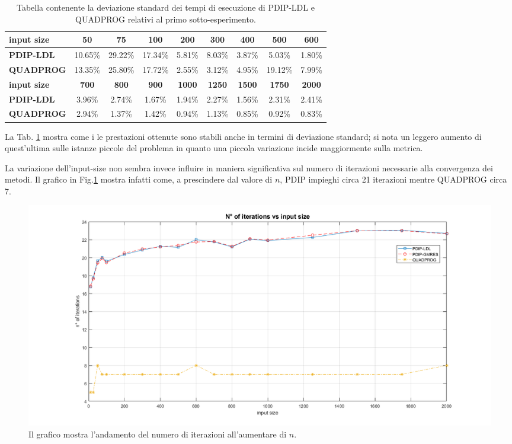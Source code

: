     
\begin{table}[!h]
\centering
\begin{tabular}{|l|c|c|c|c|c|c|c|c|}\hline
\textbf{input size} & \textbf{50}  & \textbf{75}  & \textbf{100} & \textbf{200}  & \textbf{300}  & \textbf{400}  & \textbf{500}  & \textbf{600}  \\\hline
\textbf{PDIP-LDL}   & 10.65\%      & 29.22\%      & 17.34\%      & 5.81\%        & 8.03\%        & 3.87\%        & 5.03\%        & 1.80\%        \\
\textbf{QUADPROG}   & 13.35\%      & 25.80\%      & 17.72\%      & 2.55\%        & 3.12\%        & 4.95\%        & 19.12\%       & 7.99\%        \\\hline
\textbf{input size} & \textbf{700} & \textbf{800} & \textbf{900} & \textbf{1000} & \textbf{1250} & \textbf{1500} & \textbf{1750} & \textbf{2000} \\\hline
\textbf{PDIP-LDL}   & 3.96\%       & 2.74\%       & 1.67\%       & 1.94\%        & 2.27\%        & 1.56\%        & 2.31\%        & 2.41\%        \\
\textbf{QUADPROG}   & 2.94\%       & 1.37\%       & 1.42\%       & 0.94\%        & 1.13\%        & 0.85\%        & 0.92\%        & 0.83\%     \\  \hline
\end{tabular}
    \caption{Tabella contenente la deviazione standard dei tempi di esecuzione di PDIP-LDL e QUADPROG relativi al primo sotto-esperimento. \label{tab:ldlqp1.1}}
\end{table}

La Tab. \ref{tab:ldlqp1.1} mostra come i le prestazioni ottenute sono stabili anche in termini di deviazione standard; si nota un leggero aumento di quest'ultima sulle istanze piccole del problema in quanto una piccola variazione incide maggiormente sulla metrica.

La variazione dell'input-size non sembra invece influire in maniera significativa sul  numero di iterazioni necessarie alla convergenza dei metodi.
Il grafico in Fig.\ref{fig:exp1.2} mostra infatti come, a prescindere dal valore di $n$, PDIP impieghi circa 21 iterazioni mentre QUADPROG circa 7.

\begin{figure}[!h]
    \centering
    \includegraphics[width=\textwidth]{img/MU7.png}
    \caption{Il grafico mostra l'andamento del numero di iterazioni all'aumentare di $n$. \label{fig:exp1.2}}
\end{figure}

